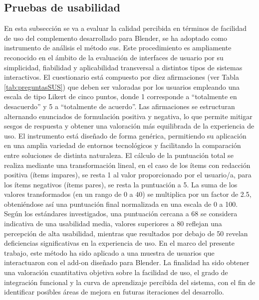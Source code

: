 \subsection{Pruebas de usabilidad}
En esta subsección se va a evaluar la calidad percibida en términos de facilidad de uso del complemento desarrollado para Blender, se ha adoptado como instrumento de análisis el método \gls{sus}. Este procedimiento es ampliamente reconocido en el ámbito de la evaluación de interfaces de usuario por su simplicidad, fiabilidad y aplicabilidad transversal a distintos tipos de sistemas interactivos. El cuestionario está compuesto por diez afirmaciones (ver Tabla \ref{tab:preguntasSUS}) que deben ser valoradas por los usuarios empleando una escala de tipo Likert de cinco puntos, donde 1 corresponde a “totalmente en desacuerdo” y 5 a “totalmente de acuerdo”. Las afirmaciones se estructuran alternando enunciados de formulación positiva y negativa, lo que permite mitigar sesgos de respuesta y obtener una valoración más equilibrada de la experiencia de uso. El instrumento está diseñado de forma genérica, permitiendo su aplicación en una amplia variedad de entornos tecnológicos y facilitando la comparación entre soluciones de distinta naturaleza. El cálculo de la puntuación total se realiza mediante una transformación lineal, en el caso de los ítems con redacción positiva (ítems impares), se resta 1 al valor proporcionado por el usuario/a, para los ítems negativos (ítems pares), se resta la puntuación a 5. La suma de los valores transformados (en un rango de 0 a 40) se multiplica por un factor de 2.5, obteniéndose así una puntuación final normalizada en una escala de 0 a 100. Según los estándares investigados, una puntuación cercana a 68 se considera indicativa de una usabilidad media, valores superiores a 80 reflejan una percepción de alta usabilidad, mientras que resultados por debajo de 50 revelan deficiencias significativas en la experiencia de uso. En el marco del presente trabajo, este método ha sido aplicado a una muestra de usuarios que interactuaron con el add-on diseñado para Blender. La finalidad ha sido obtener una valoración cuantitativa objetiva sobre la facilidad de uso, el grado de integración funcional y la curva de aprendizaje percibida del sistema, con el fin de identificar posibles áreas de mejora en futuras iteraciones del desarrollo.\\

